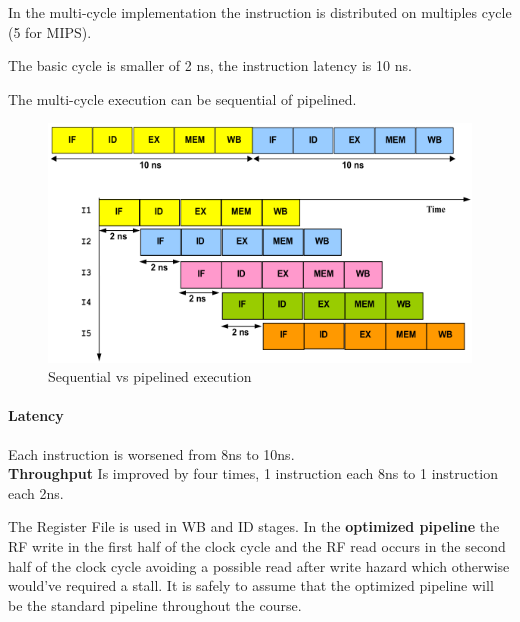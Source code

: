 In the multi-cycle implementation the instruction is distributed on multiples cycle (5 for MIPS).

The basic cycle is smaller of 2 ns, the instruction latency is 10 ns.

The multi-cycle execution can be sequential of pipelined.
\begin{figure}[h]
    \centering
    \includegraphics[scale=0.4]{images/sequential-vs-pipelined}
    \caption{Sequential vs pipelined execution}
    \label{fig:sequential-vs-sequential}
\end{figure}

\paragraph{Latency} Each instruction is worsened from 8ns to 10ns.\\
\textbf{Throughput} Is improved by four times, 1 instruction each 8ns to 1 instruction each 2ns.


The Register File is used in WB and ID stages.
In the \textbf{optimized pipeline} the RF write in the first half of the clock cycle and the RF read occurs in the
second half of the clock cycle avoiding a possible read after write hazard which otherwise would've required a stall.
It is safely to assume that the optimized pipeline will be the standard pipeline throughout the course.